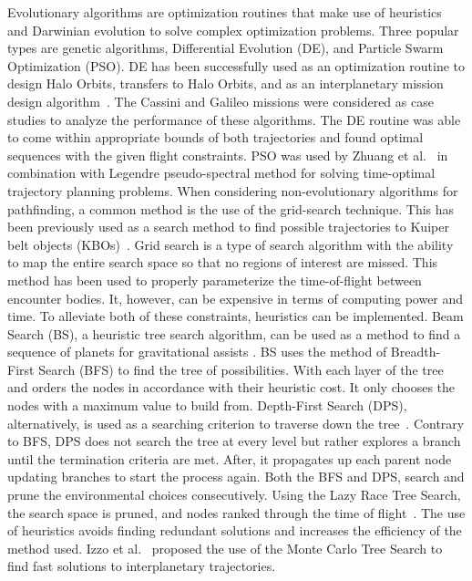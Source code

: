 \documentclass[letterpaper, paper,11pt]{AAS}	%
\begin{document}
Evolutionary algorithms are optimization routines that make use of heuristics and Darwinian evolution to solve complex optimization problems. Three popular types are genetic algorithms, Differential Evolution (DE), and Particle Swarm Optimization (PSO). DE has been successfully used as an optimization routine to design Halo Orbits, transfers to Halo Orbits, and as an interplanetary mission design algorithm~\cite{Nath2016, Olds2007}.  The Cassini and Galileo missions were considered as case studies to analyze the performance of these algorithms. The DE routine was able to come within appropriate bounds of both trajectories and found optimal sequences with the given flight constraints. PSO was used by Zhuang et al.~\cite{Zhuang2014} in combination with Legendre pseudo-spectral method for solving time-optimal trajectory planning problems. When considering non-evolutionary algorithms for pathfinding, a common method is the use of the grid-search technique. This has been previously used as a search method to find possible trajectories to Kuiper belt objects (KBOs)~\cite{Penas2019}. Grid search is a type of search algorithm with the ability to map the entire search space so that no regions of interest are missed. This method has been used to properly parameterize the time-of-flight between encounter bodies. It, however, can be expensive in terms of computing power and time. To alleviate both of these constraints, heuristics can be implemented. Beam Search (BS), a heuristic tree search algorithm, can be used as a method to find a sequence of planets for gravitational assists \cite{Penas2019}. BS uses the method of Breadth-First Search (BFS) to find the tree of possibilities. With each layer of the tree and orders the nodes in accordance with their heuristic cost. It only chooses the nodes with a maximum value to build from. Depth-First Search (DPS), alternatively, is used as a searching criterion to traverse down the tree~\cite{Izzo2013}. Contrary to BFS, DPS does not search the tree at every level but rather explores a branch until the termination criteria are met. After, it propagates up each parent node updating branches to start the process again. Both the BFS and DPS, search and prune the environmental choices consecutively. Using the Lazy Race Tree Search, the search space is pruned, and nodes ranked through the time of flight~\cite{Izzo2013}. The use of heuristics avoids finding redundant solutions and increases the efficiency of the method used. Izzo et al.~\cite{Hennes2015} proposed the use of the Monte Carlo Tree Search to find fast solutions to interplanetary trajectories.
\end{document}

